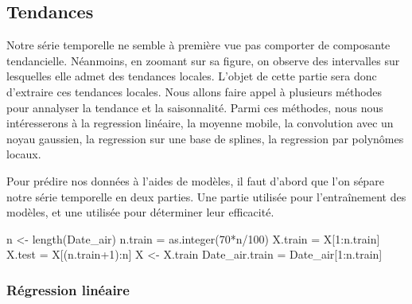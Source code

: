 \documentclass[
]{article}
\newenvironment{Shaded}{\begin{snugshade}}{\end{snugshade}}
\newcommand{\DecValTok}[1]{\textcolor[rgb]{0.00,0.00,0.81}{#1}}
\newcommand{\FunctionTok}[1]{\textcolor[rgb]{0.00,0.00,0.00}{#1}}
\newcommand{\NormalTok}[1]{#1}
\newcommand{\OtherTok}[1]{\textcolor[rgb]{0.56,0.35,0.01}{#1}}
\newcommand{\SpecialCharTok}[1]{\textcolor[rgb]{0.00,0.00,0.00}{#1}}
\begin{document}
\hypertarget{tendances}{%
\subsection{Tendances}\label{tendances}}

Notre série temporelle ne semble à première vue pas comporter de
composante tendancielle. Néanmoins, en zoomant sur sa figure, on observe
des intervalles sur lesquelles elle admet des tendances locales. L'objet
de cette partie sera donc d'extraire ces tendances locales. Nous allons
faire appel à plusieurs méthodes pour annalyser la tendance et la
saisonnalité. Parmi ces méthodes, nous nous intéresserons à la
regression linéaire, la moyenne mobile, la convolution avec un noyau
gaussien, la regression sur une base de splines, la regression par
polynômes locaux.

Pour prédire nos données à l'aides de modèles, il faut d'abord que l'on
sépare notre série temporelle en deux parties. Une partie utilisée pour
l'entraînement des modèles, et une utilisée pour déterminer leur
efficacité.

\begin{Shaded}
\begin{Highlighting}[]
\NormalTok{n }\OtherTok{\textless{}{-}} \FunctionTok{length}\NormalTok{(Date\_air)}
\NormalTok{n.train }\OtherTok{=} \FunctionTok{as.integer}\NormalTok{(}\DecValTok{70}\SpecialCharTok{*}\NormalTok{n}\SpecialCharTok{/}\DecValTok{100}\NormalTok{)}
\NormalTok{X.train }\OtherTok{=}\NormalTok{ X[}\DecValTok{1}\SpecialCharTok{:}\NormalTok{n.train]}
\NormalTok{X.test }\OtherTok{=}\NormalTok{ X[(n.train}\SpecialCharTok{+}\DecValTok{1}\NormalTok{)}\SpecialCharTok{:}\NormalTok{n]}
\NormalTok{X }\OtherTok{\textless{}{-}}\NormalTok{ X.train}
\NormalTok{Date\_air.train }\OtherTok{=}\NormalTok{ Date\_air[}\DecValTok{1}\SpecialCharTok{:}\NormalTok{n.train]}
\end{Highlighting}
\end{Shaded}

\hypertarget{ruxe9gression-linuxe9aire}{%
\subsubsection{Régression linéaire}\label{ruxe9gression-linuxe9aire}}
\end{document}

